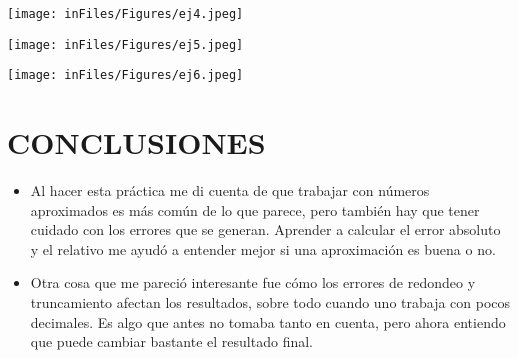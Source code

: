 \documentclass[12pt]{article}
\begin{document}
\vspace{0.5cm}

\begin{minipage}{0.95\textwidth}
    \raggedleft
    \texttt{[image: inFiles/Figures/ej4.jpeg]}
\end{minipage}

\vspace{0.5cm}

\begin{minipage}{0.95\textwidth}
    \raggedleft
    \texttt{[image: inFiles/Figures/ej5.jpeg]}
\end{minipage}

\vspace{0.5cm}

\begin{minipage}{0.95\textwidth}
    \raggedleft
    \texttt{[image: inFiles/Figures/ej6.jpeg]}
\end{minipage}

\vspace{3cm}


\section*{CONCLUSIONES}
\begin{itemize}
    \item {Al hacer esta práctica me di cuenta de que trabajar con números aproximados es más común de lo que parece, pero también hay que tener cuidado con los errores que se generan. 
    Aprender a calcular el error absoluto y el relativo me ayudó a entender mejor si una aproximación es buena o no.}

     \item {Otra cosa que me pareció interesante fue cómo los errores de redondeo y truncamiento afectan los resultados, sobre todo cuando uno trabaja con pocos decimales. 
     Es algo que antes no tomaba tanto en cuenta, pero ahora entiendo que puede cambiar bastante el resultado final.}
\end{itemize}


\vspace{0.5cm}
\end{document}
